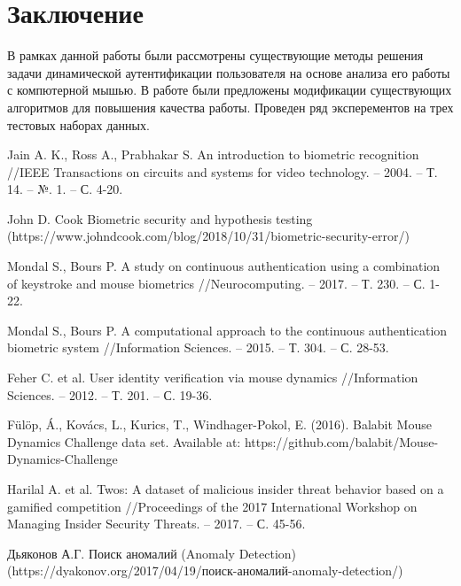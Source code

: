 \documentclass[12pt]{article}
\begin{document}
    \newpage



    \section{Заключение}
    \label{sec:Conclusion}

    \par В рамках данной работы были рассмотрены существующие методы решения задачи динамической аутентификации пользователя на основе анализа его работы с компютерной мышью. В работе были предложены модификации существующих алгоритмов для повышения качества работы. Проведен ряд эксперементов на трех тестовых наборах данных.

    \newpage



    \begin{thebibliography}{20}
        Jain A. K., Ross A., Prabhakar S. An introduction to biometric recognition //IEEE Transactions on circuits and systems for video technology. – 2004. – Т. 14. – №. 1. – С. 4-20.

        John D. Cook Biometric security and hypothesis testing (https://www.johndcook.com/blog/2018/10/31/biometric-security-error/)

        Mondal S., Bours P. A study on continuous authentication using a combination of keystroke and mouse biometrics //Neurocomputing. – 2017. – Т. 230. – С. 1-22.

        Mondal S., Bours P. A computational approach to the continuous authentication biometric system //Information Sciences. – 2015. – Т. 304. – С. 28-53.

        Feher C. et al. User identity verification via mouse dynamics //Information Sciences. – 2012. – Т. 201. – С. 19-36.

        Fülöp, Á., Kovács, L., Kurics, T., Windhager-Pokol, E. (2016). Balabit Mouse Dynamics Challenge data set. Available at: https://github.com/balabit/Mouse-Dynamics-Challenge

        Harilal A. et al. Twos: A dataset of malicious insider threat behavior based on a gamified competition //Proceedings of the 2017 International Workshop on Managing Insider Security Threats. – 2017. – С. 45-56.

        Дьяконов А.Г. Поиск аномалий (Anomaly Detection) (https://dyakonov.org/2017/04/19/поиск-аномалий-anomaly-detection/)


\end{thebibliography}
\end{document}
